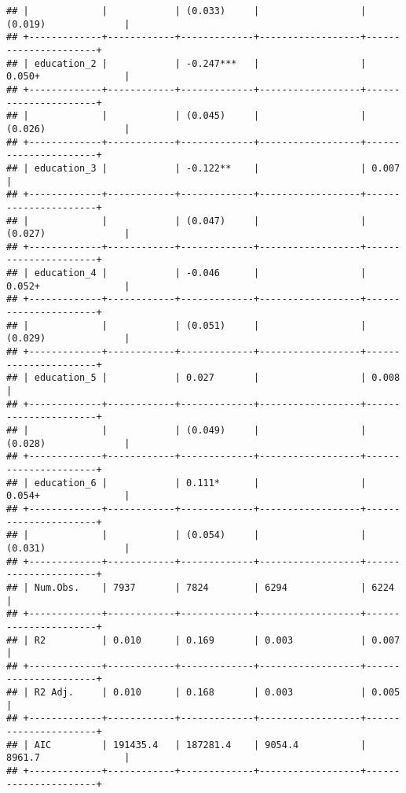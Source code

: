 \begin{verbatim}
## |             |            | (0.033)     |                  | (0.019)              |
## +-------------+------------+-------------+------------------+----------------------+
## | education_2 |            | -0.247***   |                  | 0.050+               |
## +-------------+------------+-------------+------------------+----------------------+
## |             |            | (0.045)     |                  | (0.026)              |
## +-------------+------------+-------------+------------------+----------------------+
## | education_3 |            | -0.122**    |                  | 0.007                |
## +-------------+------------+-------------+------------------+----------------------+
## |             |            | (0.047)     |                  | (0.027)              |
## +-------------+------------+-------------+------------------+----------------------+
## | education_4 |            | -0.046      |                  | 0.052+               |
## +-------------+------------+-------------+------------------+----------------------+
## |             |            | (0.051)     |                  | (0.029)              |
## +-------------+------------+-------------+------------------+----------------------+
## | education_5 |            | 0.027       |                  | 0.008                |
## +-------------+------------+-------------+------------------+----------------------+
## |             |            | (0.049)     |                  | (0.028)              |
## +-------------+------------+-------------+------------------+----------------------+
## | education_6 |            | 0.111*      |                  | 0.054+               |
## +-------------+------------+-------------+------------------+----------------------+
## |             |            | (0.054)     |                  | (0.031)              |
## +-------------+------------+-------------+------------------+----------------------+
## | Num.Obs.    | 7937       | 7824        | 6294             | 6224                 |
## +-------------+------------+-------------+------------------+----------------------+
## | R2          | 0.010      | 0.169       | 0.003            | 0.007                |
## +-------------+------------+-------------+------------------+----------------------+
## | R2 Adj.     | 0.010      | 0.168       | 0.003            | 0.005                |
## +-------------+------------+-------------+------------------+----------------------+
## | AIC         | 191435.4   | 187281.4    | 9054.4           | 8961.7               |
## +-------------+------------+-------------+------------------+----------------------+

\end{verbatim}
